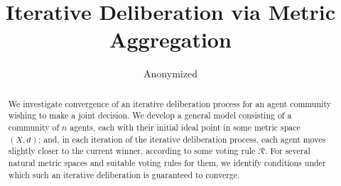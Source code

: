 \documentclass[runningheads]{llncs}
\title{Iterative Deliberation via Metric Aggregation}
\author{Anonymized}
\institute{}
\date{}
\begin{document}
\maketitle


\begin{abstract}
%
We investigate convergence of an iterative deliberation process for an agent community wishing to make a joint decision. 
%
We develop a general model consisting of a community of $n$ agents, each with their initial ideal point in some metric space $(X, d)$; and, in each iteration of the iterative deliberation process, each agent moves slightly closer to the current winner, according to some voting rule $\mathcal{R}$.
%
For several natural metric spaces and suitable voting rules for them, we identify conditions under which such an iterative deliberation is guaranteed to converge.
%
\end{abstract}
\end{document}
